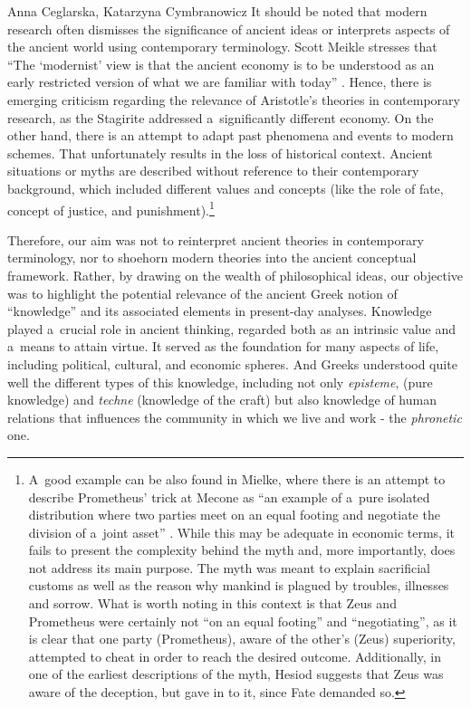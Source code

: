 \begin{artengenv2auth}{Anna Ceglarska, Katarzyna Cymbranowicz}
It should be noted that modern research often dismisses the significance of ancient ideas or interprets aspects of the ancient world using contemporary terminology. Scott Meikle stresses that ``The ‘modernist' view is that the ancient economy is to be understood as an early restricted version of what we are familiar with today'' 
\parencite[][p.2]{meikle_aristotles_1995}. %
 Hence, there is emerging criticism regarding the relevance of Aristotle's theories in contemporary research, as the Stagirite addressed a~significantly different economy. On the other hand, there is an attempt to adapt past phenomena and events to modern schemes. That unfortunately results in the loss of historical context. Ancient situations or myths are described without reference to their contemporary background, which included different values and concepts (like the role of fate, concept of justice, and punishment).\footnote{A~good example can be also found in Mielke, where there is an attempt to describe Prometheus' trick at Mecone as ``an example of a~pure isolated distribution where two parties meet on an equal footing and negotiate the division of a~joint asset'' 
\parencite[][p.178]{meikle_aristotles_1995}. %
 While this may be adequate in economic terms, it fails to present the complexity behind the myth and, more importantly, does not address its main purpose. The myth was meant to explain sacrificial customs as well as the reason why mankind is plagued by troubles, illnesses and sorrow. What is worth noting in this context is that Zeus and Prometheus were certainly not ``on an equal footing'' and ``negotiating'', as it is clear that one party (Prometheus), aware of the other's (Zeus) superiority, attempted to cheat in order to reach the desired outcome. Additionally, in one of the earliest descriptions of the myth, Hesiod suggests that Zeus was aware of the deception, but gave in to it, since Fate demanded so.}



Therefore, our aim was not to reinterpret ancient theories in contemporary terminology, nor to shoehorn modern theories into the ancient conceptual framework. Rather, by drawing on the wealth of philosophical ideas, our objective was to highlight the potential relevance of the ancient Greek notion of ``knowledge'' and its associated elements in present-day analyses. Knowledge played a~crucial role in ancient thinking, regarded both as an intrinsic value and a~means to attain virtue. It served as the foundation for many aspects of life, including political, cultural, and economic spheres. And Greeks understood quite well the different types of this knowledge, including not only \textit{episteme}, (pure knowledge) and \textit{techne} (knowledge of the craft) but also knowledge of human relations that influences the community in which we live and work - the \textit{phronetic} one.




\end{artengenv2auth}
